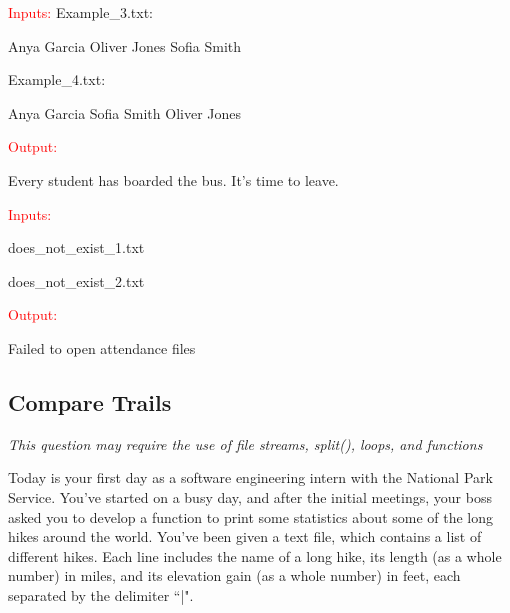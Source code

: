 \begin{sample}

\textcolor{red}{Inputs:}
Example\_3.txt: \newline
\begin{tcolorbox}[colframe=blue, colback=white, boxrule=0.5mm, arc=5mm]
Anya Garcia \newline
Oliver Jones \newline
Sofia Smith
\end{tcolorbox}

Example\_4.txt:
\begin{tcolorbox}[colframe=blue, colback=white, boxrule=0.5mm, arc=5mm]
Anya Garcia \newline
Sofia Smith \newline
Oliver Jones
\end{tcolorbox}

\textcolor{red}{Output:}

Every student has boarded the bus. It's time to leave.

\end{sample}

\begin{sample}
\textcolor{red}{Inputs:}

does\_not\_exist\_1.txt

does\_not\_exist\_2.txt

\textcolor{red}{Output:}

Failed to open attendance files

\end{sample}

\subsection{Compare Trails} %
\textit{This question may require the use of file streams, split(), loops, and functions} \newline

Today is your first day as a software engineering intern with the National Park Service. You've started on a busy day, and after the initial meetings, your boss asked you to develop a function to print some statistics about some of the long hikes around the world. You've been given a text file, which contains a list of different hikes. Each line includes the name of a long hike, its length (as a whole number) in miles, and its elevation gain (as a whole number) in feet, each separated by the delimiter ``|".

